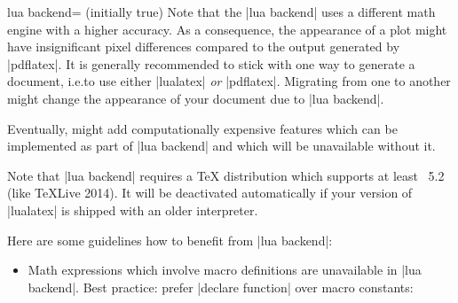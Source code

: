 {\begin{pgfplotskey}{lua backend= (initially true)}
    Note that the |lua backend| uses a different math engine with a higher
    accuracy. As a consequence, the appearance of a plot might have
    insignificant pixel differences compared to the output generated by
    |pdflatex|. It is generally recommended to stick with one way to generate a
    document, i.e.\@ to use either |lualatex| \emph{or} |pdflatex|. Migrating
    from one to another might change the appearance of your document due to
    |lua backend|.

    Eventually, \PGFPlots{} might add computationally expensive features which
    can be implemented as part of |lua backend| and which will be unavailable
    without it.

    Note that |lua backend| requires a \TeX{} distribution which supports at
    least \lua~5.2 (like \TeX{}Live 2014). It will be deactivated
    automatically if your version of |lualatex| is shipped with an older \lua{}
    interpreter.

    Here are some guidelines how to benefit from |lua backend|:
    \begin{itemize}
        \item Math expressions which involve macro definitions are
            unavailable in |lua backend|. Best practice: prefer
            |declare function| over macro constants:
\begin{codeexample}[]
\end{codeexample}

\begin{codeexample}[]
\end{codeexample}


\end{itemize}
\end{pgfplotskey}}

